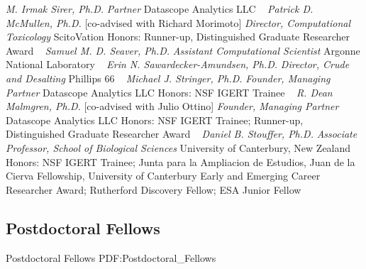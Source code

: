 \textit{M. Irmak Sirer, Ph.D.}
\newline
    \textit{Partner}
    \newline
    Datascope Analytics LLC
    \newline
~
\Gap{}
\textit{Patrick D. McMullen, Ph.D.}
    [co-advised with Richard Morimoto]
\newline
    \textit{Director, Computational Toxicology}
    \newline
    ScitoVation
    \newline
    {\footnotesize Honors: Runner-up, Distinguished Graduate Researcher Award}
    \newline
~
\Gap{}
\textit{Samuel M. D. Seaver, Ph.D.}
\newline
    \textit{Assistant Computational Scientist}
    \newline
    Argonne National Laboratory
    \newline
~
\Gap{}
\textit{Erin N. Sawardecker-Amundsen, Ph.D.}
\newline
    \textit{Director, Crude and Desalting}
    \newline
    Phillips 66
    \newline
~
\Gap{}
\textit{Michael J. Stringer, Ph.D.}
\newline
    \textit{Founder, Managing Partner}
    \newline
    Datascope Analytics LLC
    \newline
    {\footnotesize Honors: NSF IGERT Trainee}
    \newline
~
\Gap{}
\textit{R. Dean Malmgren, Ph.D.}
    [co-advised with Julio Ottino]
\newline
    \textit{Founder, Managing Partner}
    \newline
    Datascope Analytics LLC
    \newline
    {\footnotesize Honors: NSF IGERT Trainee; Runner-up, Distinguished Graduate Researcher Award}
    \newline
~
\Gap{}
\textit{Daniel B. Stouffer, Ph.D.}
\newline
    \textit{Associate Professor, School of Biological Sciences}
    \newline
    University of Canterbury, New Zealand
    \newline
    {\footnotesize Honors: NSF IGERT Trainee; Junta para la Ampliacion de Estudios, Juan de la Cierva Fellowship, University of Canterbury Early and Emerging Career Researcher Award; Rutherford Discovery Fellow; ESA Junior Fellow}
    \newline
~
\Gap\vspace*{0.2cm}\subsection
{Postdoctoral Fellows}
{Postdoctoral Fellows}
{PDF:Postdoctoral_Fellows}

